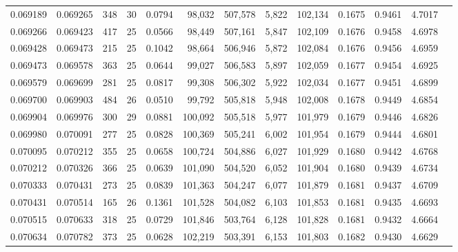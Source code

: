 \begin{tabular}{rrrrrrrrrrrrr}
0.069189 & 0.069265 & 348 &  30 &                                     0.0794 &  98,032 & 507,578 &   5,822 & 102,134 & 0.1675 & 0.9461 & 4.7017 \\
0.069266 & 0.069423 & 417 &  25 &                                     0.0566 &  98,449 & 507,161 &   5,847 & 102,109 & 0.1676 & 0.9458 & 4.6978 \\
0.069428 & 0.069473 & 215 &  25 &                                     0.1042 &  98,664 & 506,946 &   5,872 & 102,084 & 0.1676 & 0.9456 & 4.6959 \\
0.069473 & 0.069578 & 363 &  25 &                                     0.0644 &  99,027 & 506,583 &   5,897 & 102,059 & 0.1677 & 0.9454 & 4.6925 \\
0.069579 & 0.069699 & 281 &  25 &                                     0.0817 &  99,308 & 506,302 &   5,922 & 102,034 & 0.1677 & 0.9451 & 4.6899 \\
0.069700 & 0.069903 & 484 &  26 &                                     0.0510 &  99,792 & 505,818 &   5,948 & 102,008 & 0.1678 & 0.9449 & 4.6854 \\
0.069904 & 0.069976 & 300 &  29 &                                     0.0881 & 100,092 & 505,518 &   5,977 & 101,979 & 0.1679 & 0.9446 & 4.6826 \\
0.069980 & 0.070091 & 277 &  25 &                                     0.0828 & 100,369 & 505,241 &   6,002 & 101,954 & 0.1679 & 0.9444 & 4.6801 \\
0.070095 & 0.070212 & 355 &  25 &                                     0.0658 & 100,724 & 504,886 &   6,027 & 101,929 & 0.1680 & 0.9442 & 4.6768 \\
0.070212 & 0.070326 & 366 &  25 &                                     0.0639 & 101,090 & 504,520 &   6,052 & 101,904 & 0.1680 & 0.9439 & 4.6734 \\
0.070333 & 0.070431 & 273 &  25 &                                     0.0839 & 101,363 & 504,247 &   6,077 & 101,879 & 0.1681 & 0.9437 & 4.6709 \\
0.070431 & 0.070514 & 165 &  26 &                                     0.1361 & 101,528 & 504,082 &   6,103 & 101,853 & 0.1681 & 0.9435 & 4.6693 \\
0.070515 & 0.070633 & 318 &  25 &                                     0.0729 & 101,846 & 503,764 &   6,128 & 101,828 & 0.1681 & 0.9432 & 4.6664 \\
0.070634 & 0.070782 & 373 &  25 &                                     0.0628 & 102,219 & 503,391 &   6,153 & 101,803 & 0.1682 & 0.9430 & 4.6629 \\

\end{tabular}

